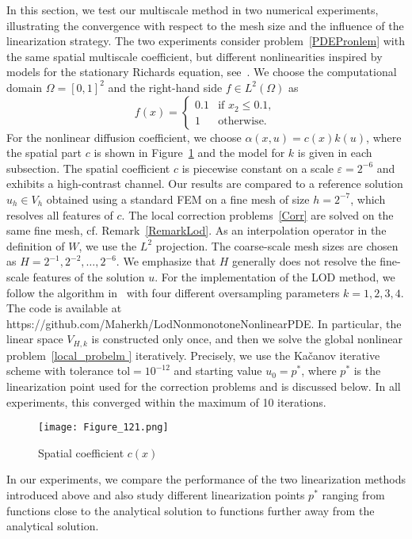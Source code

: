 \documentclass{article}
\begin{document}
In this section, we test our multiscale method in two numerical experiments, illustrating the convergence with respect to the mesh size and the influence of the linearization strategy. The two experiments consider problem~\eqref{PDEPronlem} with the same spatial multiscale coefficient, but different nonlinearities inspired by models for the stationary Richards equation, see~\cite{exmaples}. 
We choose the computational domain $\Omega=[0,1]^2$ and the right-hand side $f \in L^2(\Omega)$ as
 \[f(x) = \begin{cases}
    0.1 & \text{if } x_2 \leq 0.1, \\
    1 & \text{otherwise}.
\end{cases} \]
For the nonlinear diffusion coefficient, we choose $\alpha(x,u)=c(x)k(u)$, where the spatial part $c$ is shown in Figure~\ref{variation} and the model for $k$ is given in each subsection. The spatial coefficient $c$ is piecewise constant on a scale $\varepsilon=2^{-6}$ and exhibits a high-contrast channel. Our results are compared to a reference solution $u_h \in V_h$ obtained using a standard FEM on a fine mesh of size $h=2^{-7}$, which resolves all features of $c$. The local correction problems~\eqref{Corr} are solved on the same fine mesh, cf. Remark~\ref{RemarkLod}. As an interpolation operator in the definition of $W$, we use the $L^2$ projection. The coarse-scale mesh sizes are chosen as $H=2^{-1},2^{-2},\ldots ,2^{-6}$. We emphasize that $H$ generally does not resolve the fine-scale features of the solution $u$. For the implementation of the LOD method, we follow the algorithm in~\cite{TheCode} with four different oversampling parameters $k=1,2,3,4$. The code is available at https://github.com/Maherkh/LodNonmonotoneNonlinearPDE. In particular, the linear space $V_{H,k}$ is constructed only once, and then we solve the global nonlinear problem~\eqref{local_probelm } iteratively. Precisely, we use the Kačanov iterative scheme with tolerance $\text{tol}=10^{-12}$ and starting value $u_0=p^*$, where $p^*$ is the linearization point used for the correction problems and is discussed below. In all experiments, this converged within the maximum of 10 iterations. 
\begin{figure} 
    \centering
    \texttt{[image: Figure\_121.png]}
    \caption{Spatial coefficient $c(x)$ }\label{variation}
\end{figure}
 In our experiments, we compare the performance of the two linearization methods introduced above and also study different linearization points $p^*$ ranging from functions close to the analytical solution to functions further away from the analytical solution. 
\end{document}

